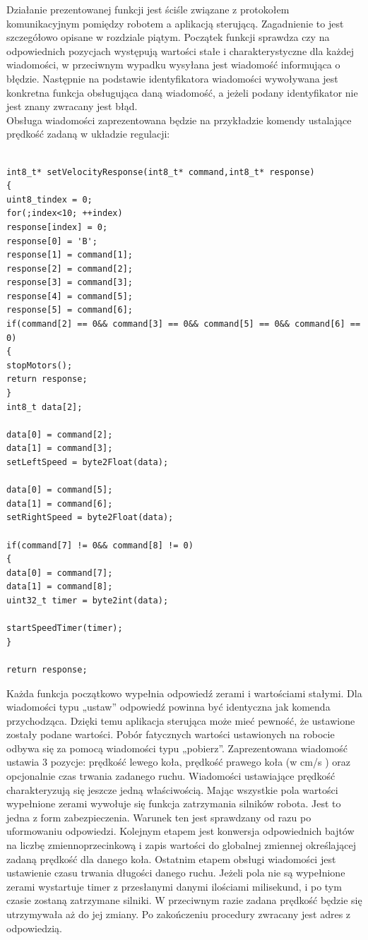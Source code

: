 \documentclass[eng,printmode]{mgr}
\begin{document}
Działanie prezentowanej funkcji jest ściśle związane z protokołem komunikacyjnym pomiędzy robotem a aplikacją sterującą. Zagadnienie to jest szczegółowo opisane w rozdziale piątym. Początek funkcji sprawdza czy na odpowiednich pozycjach występują wartości stałe i charakterystyczne dla każdej wiadomości, w przeciwnym wypadku wysyłana jest wiadomość informująca o błędzie. Następnie na podstawie identyfikatora wiadomości wywoływana jest konkretna funkcja obsługująca daną wiadomość, a jeżeli podany identyfikator nie jest znany zwracany jest błąd. 
\\Obsługa wiadomości zaprezentowana będzie na przykładzie komendy ustalające prędkość zadaną  w układzie regulacji:
\begin{lstlisting}[style=c]

int8_t* setVelocityResponse(int8_t* command,int8_t* response)
{
uint8_tindex = 0;
for(;index<10; ++index)
response[index] = 0;
response[0] = 'B';
response[1] = command[1];
response[2] = command[2];
response[3] = command[3];
response[4] = command[5];
response[5] = command[6];
if(command[2] == 0&& command[3] == 0&& command[5] == 0&& command[6] == 0)
{
stopMotors();
return response;
}
int8_t data[2];

data[0] = command[2];
data[1] = command[3];
setLeftSpeed = byte2Float(data);

data[0] = command[5];
data[1] = command[6];
setRightSpeed = byte2Float(data);

if(command[7] != 0&& command[8] != 0)
{
data[0] = command[7];
data[1] = command[8];
uint32_t timer = byte2int(data);

startSpeedTimer(timer);
}

return response;
\end{lstlisting}


Każda funkcja początkowo wypełnia odpowiedź zerami i wartościami stałymi. Dla wiadomości typu „ustaw” odpowiedź powinna być identyczna jak komenda przychodząca. Dzięki temu aplikacja sterująca może mieć pewność, że ustawione zostały podane wartości. Pobór fatycznych wartości ustawionych na robocie odbywa się za pomocą wiadomości typu „pobierz”.  Zaprezentowana wiadomość ustawia 3 pozycje: prędkość lewego koła, prędkość prawego koła (w cm/s ) oraz opcjonalnie czas trwania zadanego ruchu. Wiadomości ustawiające prędkość charakteryzują się jeszcze jedną właściwością. Mając wszystkie pola wartości  wypełnione zerami wywołuje się funkcja zatrzymania silników robota. Jest to jedna z form zabezpieczenia. Warunek ten jest sprawdzany od razu po uformowaniu odpowiedzi. Kolejnym etapem jest konwersja odpowiednich bajtów na liczbę zmiennoprzecinkową i zapis wartości do globalnej zmiennej określającej zadaną prędkość dla danego koła. Ostatnim etapem obsługi wiadomości jest ustawienie czasu trwania długości danego ruchu. Jeżeli pola nie są wypełnione zerami wystartuje timer z przesłanymi danymi ilościami milisekund, i po tym czasie zostaną zatrzymane silniki. W przeciwnym razie zadana prędkość będzie się utrzymywała aż do jej zmiany. Po zakończeniu procedury zwracany jest adres z odpowiedzią.
\end{document}
